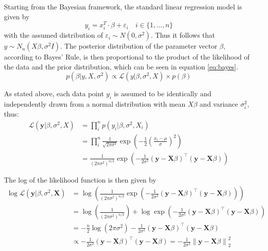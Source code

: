 \documentclass[12pt,a4paper]{article}
\newcommand{\norm}[1]{\left\lVert#1\right\rVert}
\begin{document}
Starting from the Bayesian framework, the standard linear regression model is given by
\[
y_i = x_i^T\cdot \beta + \varepsilon_i \quad i\in \{1,...,n\} 
\]
with the assumed distribution of $\varepsilon_i \sim N(0,\sigma^2)$. Thus it follows that $y\sim N_n(X\beta,\sigma^2I)$. The posterior distribution of the parameter vector $\beta$, according to Bayes' Rule, is then proportional to the product of the likelihood of the data and the prior distribution, which can be seen in equation \ref{eq:bayes}.
\begin{equation}\label{eq:bayes}
p(\beta|y, X, \sigma^2) \propto \mathcal{L}(y|\beta, \sigma^2, X)\times p(\beta)
\end{equation}	

As stated above, each data point $y_i$ is assumed to be identically and independently drawn from a normal distribution with mean $X\beta$ and variance $\sigma_i^2$, thus:
\begin{align}
\mathcal{L}(\mathbf{y}|\beta, \sigma^2, X) 	&= \prod_i^n p(y_i|\beta, \sigma^2, X_i) \nonumber\\
						&= \prod_i^n \frac{1}{\sqrt{2\pi\sigma^2}} \exp\left(-\frac{1}{2}\left(\frac{x_i-\mu}{\sigma}\right)^2\right) \nonumber\\
						&= \frac{1}{(2\pi\sigma^2)^{n/2}}\exp\left(-\frac{1}{2\sigma^2}(\mathbf{y}-\mathbf{X}\beta)^\top(\mathbf{y}-\mathbf{X}\beta)\right) \label{eq:likelihood}
\end{align}

The log of the likelihood function is then given by 
\begin{align*}
\log \mathcal{L}( \mathbf{y} |\beta, \sigma^2 , \mathbf{X}) &= \log \left( \frac{1}{(2\pi\sigma^2)^{n/2}} \exp\left(-\frac{1}{2\sigma^2} (\mathbf{y} - \mathbf{X}\beta)^\top (\mathbf{y} - \mathbf{X}\beta)\right) \right) \\
&= \log \left( \frac{1}{(2\pi\sigma^2)^{n/2}} \right) + \log \exp\left(-\frac{1}{2\sigma^2} (\mathbf{y} - \mathbf{X}\beta)^\top (\mathbf{y} - \mathbf{X}\beta)\right) \\
&= -\frac{n}{2} \log(2\pi\sigma^2) - \frac{1}{2\sigma^2} (\mathbf{y} - \mathbf{X}\beta)^\top (\mathbf{y} - \mathbf{X}\beta)\\
&\propto - \frac{1}{2\sigma^2} (\mathbf{y} - \mathbf{X}\beta)^\top (\mathbf{y} - \mathbf{X}\beta) = - \frac{1}{2\sigma^2}\norm{\mathbf{y} - \mathbf{X}\beta}_2^2\\
\end{align*}
\end{document}

